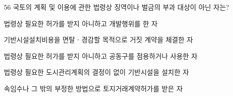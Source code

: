 \begin{question}{56}
국토의 계획 및 이용에 관한 법령상 징역이나 벌금의 부과 대상이 아닌 자는?
\begin{choices}
  \item 법령상 필요한 허가를 받지 아니하고 개발행위를 한 자
  \item 기반시설설치비용을 면탈ㆍ경감할 목적으로 거짓 계약을 체결한 자
  \item 법령상 필요한 허가를 받지 아니하고 공동구를 점용하거나 사용한 자
  \item 법령상 필요한 도시관리계획의 결정이 없이 기반시설을 설치한 자
  \item 속임수나 그 밖의 부정한 방법으로 토지거래계약허가를 받은 자
\end{choices}
\end{question}
